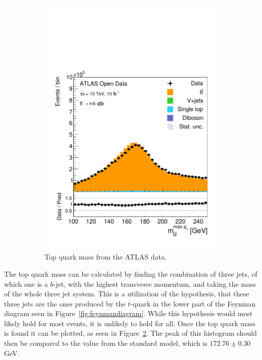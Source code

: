 \documentclass[12pt,a4paper]{article}
\numberwithin{equation}{section}
\begin{document}
\begin{figure}[t!]
\begin{subfigure}[t]{0.47\textwidth}
      \centering
      \includegraphics[width=1.0\textwidth]{figures/hist_Topmass}
      \caption{\label{fig:topmass}Top quark mass from the ATLAS data.}
    \end{subfigure}
    \caption{}
\end{figure}

The top quark mass can be calculated by finding the combination of three jets,
of which one is a $b$-jet, with the highest transverse momentum, and taking the
mass of the whole three jet system. This is a utilization of the hypothesis,
that these three jets are the ones produced by the $\overline{t}$-quark in the
lower part of the Feynman diagram seen in Figure~\ref{fig:feynmandiagram}. While
this hypothesis would most likely hold for most events, it is unlikely to hold
for all.
Once the top quark mass is found it can be plotted, as seen in
Figure~\ref{fig:topmass}. The peak of this histogram should then be compared to
the value from the standard model, which is $172.76 \pm 0.30$ GeV\cite{pdg}.
\end{document}
